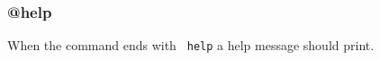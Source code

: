 \subsubsection{@help}
\label{help}

When the command ends with \texttt{~help} a help message should print.
